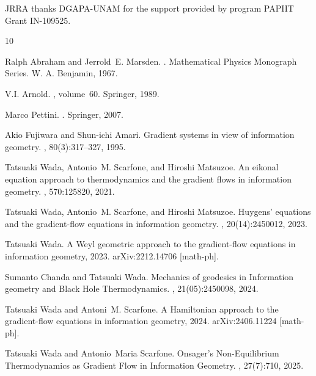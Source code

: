 \documentclass{amsart}
\theoremstyle{definition}
\begin{document}
JRRA thanks DGAPA-UNAM for the support provided by program PAPIIT Grant IN-109525.

\begin{thebibliography}{10}

Ralph Abraham and Jerrold~E. Marsden.
.
\newblock Mathematical Physics Monograph Series. W. A. Benjamin, 1967.

V.I. Arnold.
, volume~60.
\newblock Springer, 1989.

Marco Pettini.
.
\newblock Springer, 2007.

Akio Fujiwara and Shun-ichi Amari.
\newblock Gradient systems in view of information geometry.
, 80(3):317--327, 1995.

Tatsuaki Wada, Antonio~M. Scarfone, and Hiroshi Matsuzoe.
\newblock An eikonal equation approach to thermodynamics and the gradient flows
  in information geometry.
,
  570:125820, 2021.

Tatsuaki Wada, Antonio~M. Scarfone, and Hiroshi Matsuzoe.
\newblock Huygens' equations and the gradient-flow equations in information
  geometry.
,
  20(14):2450012, 2023.

Tatsuaki Wada.
\newblock A {Weyl} geometric approach to the gradient-flow equations in
  information geometry, 2023.
\newblock arXiv:2212.14706 [math-ph].

Sumanto Chanda and Tatsuaki Wada.
\newblock Mechanics of geodesics in {Information} geometry and {Black} {Hole}
  {Thermodynamics}.
,
  21(05):2450098, 2024.

Tatsuaki Wada and Antoni~M. Scarfone.
\newblock A {Hamiltonian} approach to the gradient-flow equations in
  information geometry, 2024.
\newblock arXiv:2406.11224 [math-ph].

Tatsuaki Wada and Antonio~Maria Scarfone.
\newblock Onsager’s {Non}-{Equilibrium} {Thermodynamics} as {Gradient} {Flow}
  in {Information} {Geometry}.
, 27(7):710, 2025.


\end{thebibliography}
\end{document}
